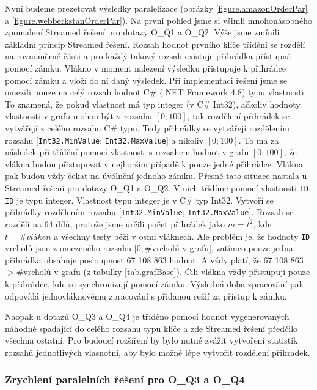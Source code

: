 Nyní budeme prezetovat výsledky paralelizace (obrázky \ref{figure.amazonOrderPar} a \ref{figure.webberkstanOrderPar}).
Na první pohled jsme si všimli mnohonásobného zpomalení Streamed řešení pro dotazy O\_Q1 a O\_Q2.
Výše jsme zmínili základní princip Streamed řešení.
Rozsah hodnot prvního klíče třídění se rozdělí na rovnoměrné části a pro každý takový rozsah existuje přihrádka přístupná pomocí zámku.
Vlákno v moment nalezení výsledku přistupuje k přihrádce pomocí zámku a vloží do ní daný výsledek.
Při implementaci řešení jsme se omezili pouze na celý rozsah hodnot C\# (.NET Framework 4.8) typu vlastnosti.
To znamená, že pokud vlastnost má typ integer (v C\# Int32), ačkoliv hodnoty vlastnosti v grafu mohou být v rozsahu $[0; 100]$, tak rozdělení přihrádek se vytvářejí z celého rozsahu C\# typu.
Tedy přihrádky se vytvářejí rozdělením rozsahu $[$\verb+Int32.MinValue+; \verb+Int32.MaxValue+$]$ a nikoliv $[0; 100]$.
To má za následek při třídění pomocí vlastnosti s rozsahem hodnot v grafu $[0; 100]$, že vlákna budou přistupovat v nejhorším případě k pouze jedné přihrádce.
Vlákna pak budou vždy čekat na úvólnění jednoho zámku.
Přesně tato situace nastala u Streamed řešení pro dotazy O\_Q1 a O\_Q2.
V nich třídíme pomocí vlastnosti \texttt{ID}. 
\texttt{ID} je typu integer.
Vlastnost typu integer je v C\# typ Int32.
Vytvoří se přihrádky rozdělením rozsahu $[$\verb+Int32.MinValue+; \verb+Int32.MaxValue+$]$.
Rozsah se rozdělí na 64 dílů, protože jsme určili počet přihrádek jako $m=t^2$, kde $t=\#vláken$ a všechny testy běži v osmi vláknech.
Ale problém je, že hodnoty \texttt{ID} vrcholů jsou z omezeného rozsahu $[0; \#$vrcholů v grafu$]$, zatímco pouze jedna přihrádka obsahuje posloupnost 67 108 863 hodnot.
A vždy platí, že 67 108 863 $> \# $vrcholů v grafu (z tabulky \ref{tab.grafBase}).
Čili vlákna vždy přistupují pouze k přihrádce, kde se synchronizují pomocí zámku. 
Výsledná doba zpracování pak odpovídá jednovláknovému zpracování s přidanou režií za přístup k zámku.

Naopak u dotazů O\_Q3 a O\_Q4 je tříděno pomocí hodnot vygenerovaných náhodně spadající do celého rozsahu typu klíče a zde Streamed řešení předčilo všechna ostatní. 
Pro budoucí rozšíření by bylo nutné zvážit vytvoření statistik rozsahů jednotlivých vlasnotní, aby bylo možné lépe vytvořit rozdělení přihrádek.

\subsubsection{Zrychlení paralelních řešení pro O\_Q3 a O\_Q4 }

